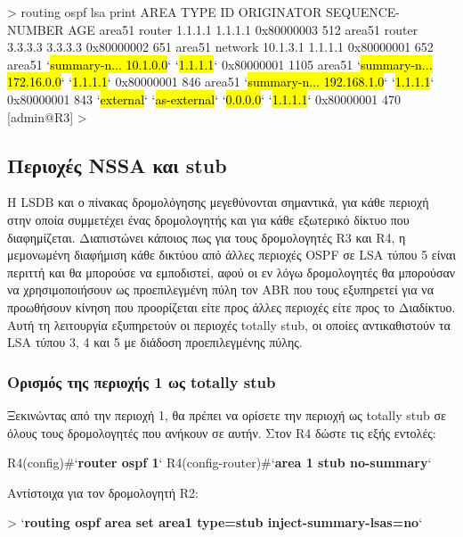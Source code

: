 \documentclass{EdipyLabs} %
\begin{document}
\begin{CommandBox}
[admin@R3] > routing ospf lsa print
AREA      TYPE         ID            ORIGINATOR  SEQUENCE-NUMBER     AGE
area51    router       1.1.1.1       1.1.1.1          0x80000003     512
area51    router       3.3.3.3       3.3.3.3          0x80000002     651
area51    network      10.1.3.1      1.1.1.1          0x80000001     652
area51    `\hl{summary-n... 10.1.0.0}`      `\hl{1.1.1.1}`          0x80000001    1105
area51    `\hl{summary-n... 172.16.0.0}`    `\hl{1.1.1.1}`          0x80000001     846
area51    `\hl{summary-n... 192.168.1.0}`   `\hl{1.1.1.1}`          0x80000001     843
`\hl{external}`  `\hl{as-external}`  `\hl{0.0.0.0}`       `\hl{1.1.1.1}`          0x80000001     470
[admin@R3] >
\end{CommandBox}

\subsection{Περιοχές NSSA και stub}

Η LSDB και ο πίνακας δρομολόγησης μεγεθύνονται σημαντικά, για κάθε περιοχή στην οποία συμμετέχει ένας δρομολογητής και για κάθε εξωτερικό δίκτυο που διαφημίζεται. Διαπιστώνει κάποιος πως για τους δρομολογητές R3 και R4, η μεμονωμένη διαφήμιση κάθε δικτύου από άλλες περιοχές OSPF σε LSA τύπου 5 είναι περιττή και θα μπορούσε να εμποδιστεί, αφού οι εν λόγω δρομολογητές θα μπορούσαν να χρησιμοποιήσουν ως προεπιλεγμένη πύλη τον ABR που τους εξυπηρετεί για να προωθήσουν κίνηση που προορίζεται είτε προς άλλες περιοχές είτε προς το Διαδίκτυο. Αυτή τη λειτουργία εξυπηρετούν οι περιοχές totally stub, οι οποίες αντικαθιστούν τα LSA τύπου 3, 4 και 5 με διάδοση προεπιλεγμένης πύλης.

\subsubsection*{Ορισμός της περιοχής 1 ως totally stub}

Ξεκινώντας από την περιοχή 1, θα πρέπει να ορίσετε την περιοχή ως totally stub σε όλους τους δρομολογητές που ανήκουν σε αυτήν. Στον R4 δώστε τις εξής εντολές:

\begin{CommandBox}
R4(config)#`\textbf{router ospf 1}`
R4(config-router)#`\textbf{area 1 stub no-summary}`
\end{CommandBox}

Αντίστοιχα για τον δρομολογητή R2:

\begin{CommandBox}
[admin@R2] > `\textbf{routing ospf area set area1 type=stub inject-summary-lsas=no}`
\end{CommandBox}
\end{document}
